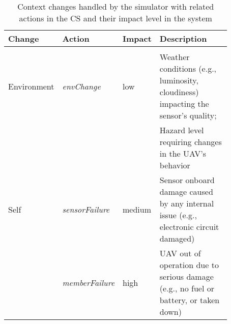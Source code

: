 \begin{table}[ht]
	\small
	\fontsize{10}{10}\selectfont
	\centering
	\caption{Context changes handled by the simulator with related actions in the CS and their impact level in the system}
	\label{table:context_changes}

	\begin{tabular}{p{0.16\linewidth}p{0.18\linewidth}p{0.1\linewidth}p{0.43\linewidth}}
	\hline
		 \textbf{Change}
		& \textbf{Action}
		& \textbf{Impact}
		& \textbf{Description}  \\ [1ex]
	\hline	\\ [-1ex] 
	Environment & \textit{envChange} & low & Weather conditions (e.g., luminosity, cloudiness) impacting the sensor's quality; \\[1ex]
	& & & Hazard level requiring changes in the UAV's behavior \\[5ex]
	Self & \textit{sensorFailure} & medium & Sensor onboard damage caused by any internal issue (\color{blue}e.g.\color{black}, electronic circuit damaged) \\[1ex]
	& \textit{memberFailure} & high & UAV out of operation due to serious damage (e.g., no fuel or battery, or taken down) \\[6ex]
	
	\hline
	\end{tabular}
\end{table} 
